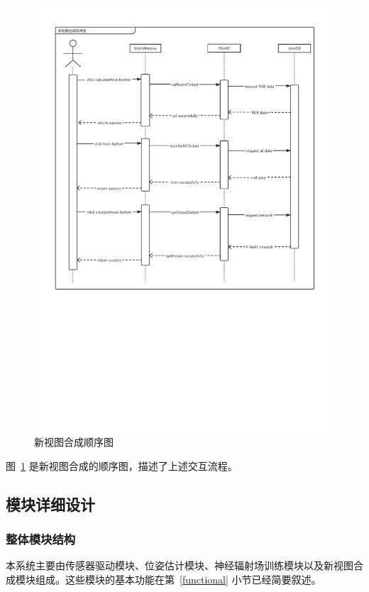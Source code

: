\begin{figure}[htbp]
	\centering
	\includegraphics[width=0.85\linewidth]{figures/viewSynthesisSD.pdf}
	\caption{新视图合成顺序图}
	\label{fig:viewSynthesisSD}
\end{figure}

图~\ref{fig:viewSynthesisSD} 是新视图合成的顺序图，描述了上述交互流程。

\pagebreak
\subsection{模块详细设计}
\subsubsection{整体模块结构}
本系统主要由传感器驱动模块、位姿估计模块、神经辐射场训练模块以及新视图合成模块组成。这些模块的基本功能在第~\ref{functional} 小节已经简要叙述。
